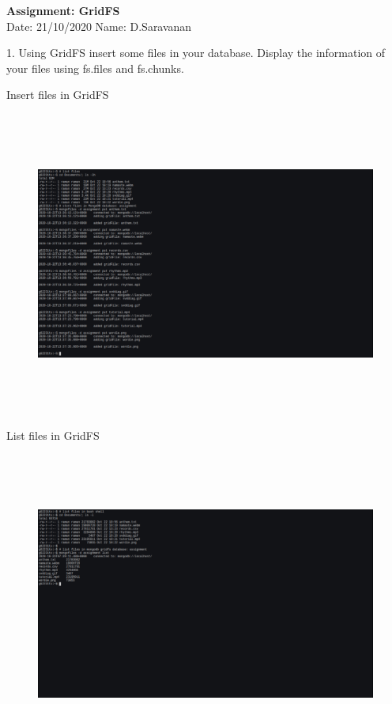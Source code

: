 \documentclass[a4paper,11pt,openright]{report}
\begin{document}
\singlespacing
\pagestyle{plain}

\begin{small}
\begin{center}
\textbf{Assignment: GridFS} \\
Date: 21/10/2020 \hspace{2mm} Name: D.Saravanan
\end{center}
\end{small}

\vspace{10px}

\begin{footnotesize}
1. Using GridFS insert some files in your database. Display the information of your files
using fs.files and fs.chunks.
\end{footnotesize}

{\footnotesize Insert files in GridFS}
\begin{figure}[ht!]
\includegraphics[width=20cm,height=10cm,keepaspectratio]{image1.pdf}
\centering
\end{figure}

{\footnotesize List files in GridFS}
\begin{figure}[ht!]
\includegraphics[width=20cm,height=10cm,keepaspectratio]{image2.pdf}
\centering
\end{figure}
\end{document}
